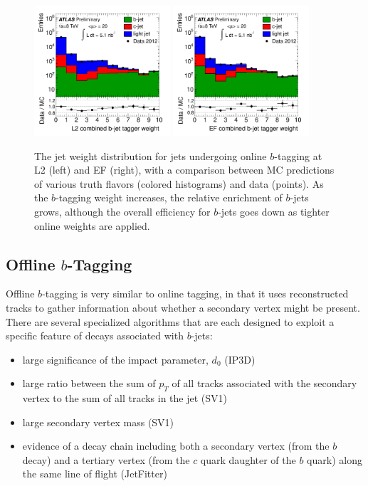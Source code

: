 \begin{figure}
	\includegraphics[width=0.45\textwidth]{ReconstructionPerformance/online_btag_L2.pdf}
	\includegraphics[width=0.45\textwidth]{ReconstructionPerformance/online_btag_EF.pdf}
	\caption{The jet weight distribution for jets undergoing online $b$-tagging at L2 (left) and EF (right),
        with a comparison between MC predictions of various truth flavors (colored histograms) and data (points).
        As the $b$-tagging weight increases, the relative enrichment of $b$-jets grows, although the overall
        efficiency for $b$-jets goes down as tighter online weights are applied. \cite{online_btag}	\label{fig:online_btag}  }
\end{figure}




\subsection{Offline $b$-Tagging}
Offline $b$-tagging is very similar to online tagging, in that it uses reconstructed tracks to gather
information about whether a secondary vertex might be present.  There are several specialized algorithms
that are each designed to exploit a specific feature of decays associated with $b$-jets:

\begin{itemize}
	\item large significance of the impact parameter, $d_0$ (IP3D)
	\item large ratio between the sum of $p_T$ of all tracks associated with the secondary vertex to the sum of all tracks in the jet (SV1)
	\item large secondary vertex mass (SV1)
	\item evidence of a decay chain including both a secondary vertex (from the $b$ decay) and a tertiary vertex (from the $c$ quark daughter of the $b$ quark) along the same line of flight (JetFitter)
\end{itemize}

